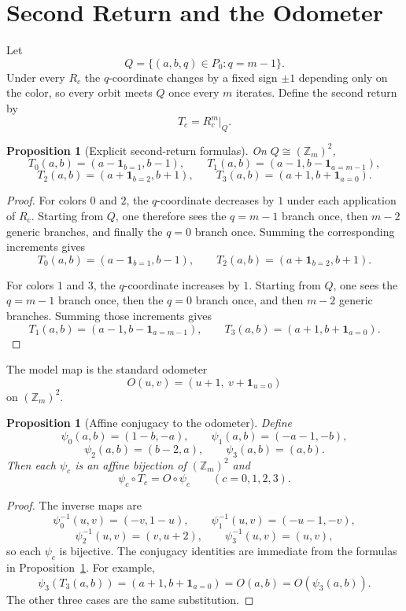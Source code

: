 \documentclass[11pt]{article}
\newtheorem{proposition}[theorem]{Proposition}
\newcommand{\Zm}{\mathbb Z_m}
\newcommand{\I}{\mathbf 1}
\newcommand{\Pzero}{P_0}
\newcommand{\Qslice}{Q}
\begin{document}
\section{Second Return and the Odometer}\label{sec:second-return}

Let
\[
\Qslice=\{(a,b,q)\in \Pzero : q=m-1\}.
\]
Under every $R_c$ the $q$-coordinate changes by a fixed sign $\pm 1$ depending
only on the color, so every orbit meets $\Qslice$ once every $m$ iterates. Define
the second return by
\[
T_c=R_c^m\big|_{\Qslice}.
\]

\begin{proposition}[Explicit second-return formulas]\label{prop:T}
On $\Qslice \cong (\Zm)^2$,
\[
T_0(a,b)=(a-\I_{b=1},b-1),
\qquad
T_1(a,b)=(a-1,b-\I_{a=m-1}),
\]
\[
T_2(a,b)=(a+\I_{b=2},b+1),
\qquad
T_3(a,b)=(a+1,b+\I_{a=0}).
\]
\end{proposition}

\begin{proof}
For colors $0$ and $2$, the $q$-coordinate decreases by $1$ under each
application of $R_c$. Starting from $\Qslice$, one therefore sees the $q=m-1$
branch once, then $m-2$ generic branches, and finally the $q=0$ branch once.
Summing the corresponding increments gives
\[
T_0(a,b)=(a-\I_{b=1},b-1),
\qquad
T_2(a,b)=(a+\I_{b=2},b+1).
\]

For colors $1$ and $3$, the $q$-coordinate increases by $1$. Starting from
$\Qslice$, one sees the $q=m-1$ branch once, then the $q=0$ branch once, and
then $m-2$ generic branches. Summing those increments gives
\[
T_1(a,b)=(a-1,b-\I_{a=m-1}),
\qquad
T_3(a,b)=(a+1,b+\I_{a=0}).
\]
\end{proof}

The model map is the standard odometer
\[
O(u,v)=(u+1,\ v+\I_{u=0})
\]
on $(\Zm)^2$.

\begin{proposition}[Affine conjugacy to the odometer]\label{prop:odometer-conj}
Define
\[
\psi_0(a,b)=(1-b,-a),
\qquad
\psi_1(a,b)=(-a-1,-b),
\]
\[
\psi_2(a,b)=(b-2,a),
\qquad
\psi_3(a,b)=(a,b).
\]
Then each $\psi_c$ is an affine bijection of $(\Zm)^2$ and
\[
\psi_c \circ T_c = O \circ \psi_c
\qquad
(c=0,1,2,3).
\]
\end{proposition}

\begin{proof}
The inverse maps are
\[
\psi_0^{-1}(u,v)=(-v,1-u),\qquad
\psi_1^{-1}(u,v)=(-u-1,-v),
\]
\[
\psi_2^{-1}(u,v)=(v,u+2),\qquad
\psi_3^{-1}(u,v)=(u,v),
\]
so each $\psi_c$ is bijective. The conjugacy identities are immediate from the
formulas in Proposition~\ref{prop:T}. For example,
\[
\psi_3(T_3(a,b))=(a+1,b+\I_{a=0})=O(a,b)=O(\psi_3(a,b)).
\]
The other three cases are the same substitution.
\end{proof}
\end{document}
